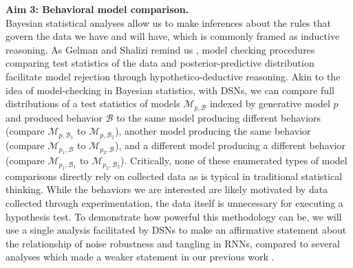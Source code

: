 \documentclass[11pt]{article}
\begin{document}
\textbf{Aim 3: Behavioral model comparison.} \\
Bayesian statistical analyses allow us to make inferences about the rules that govern the data we have and will have, which is commonly framed as inductive reasoning.  As Gelman and Shalizi remind us \cite{gelman2013philosophy}, model checking procedures comparing test statistics of the data and posterior-predictive distribution facilitate model rejection through hypothetico-deductive reasoning.  Akin to the idea of model-checking in Bayesian statistics, with DSNs, we can compare full distributions of a test statistics of models $\mathcal{M}_{p,\mathcal{B}}$ indexed by generative model $p$ and produced behavior $\mathcal{B}$ to the same model producing different behaviors (compare $\mathcal{M}_{p,\mathcal{B}_1}$ to $\mathcal{M}_{p,\mathcal{B}_2}$), another model producing the same behavior (compare $\mathcal{M}_{p_1,\mathcal{B}}$ to $\mathcal{M}_{p_2,\mathcal{B}}$), and a different model producing a different behavior (compare $\mathcal{M}_{p_1,\mathcal{B}_1}$ to $\mathcal{M}_{p_2,\mathcal{B}_2}$).  Critically, none of these enumerated types of model comparisons directly rely on collected data as is typical in traditional statistical thinking.  While the behaviors we are interested are likely motivated by data collected through experimentation, the data itself is unnecessary for executing a hypothesis test.  To demonstrate how powerful this methodology can be, we will use a single analysis facilitated by DSNs to make an affirmative statement about the relationship of noise robustness and tangling in RNNs, compared to several analyses which made a weaker statement in our previous work \cite{russo2018motor}.
\end{document}
